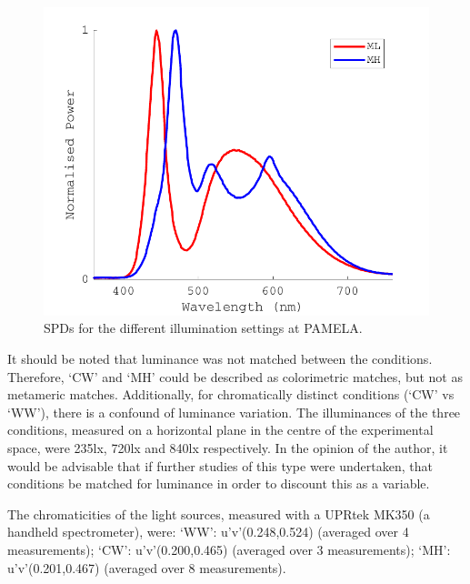 \begin{figure}[hbtp] %
\includegraphics[max width=\textwidth]{figs/tablet/PAMELA_SPD2.pdf}
\caption{\gls{SPD}s for the different illumination settings at \gls{PAMELA}.}
\label{fig:PAMELAlights5}
\end{figure}

It should be noted that luminance was not matched between the conditions. Therefore, `CW' and `MH' could be described as colorimetric matches, but not as metameric matches. Additionally, for chromatically distinct conditions (`CW' vs `WW'), there is a confound of luminance variation. The illuminances of the three conditions, measured on a horizontal plane in the centre of the experimental space, were 235lx, 720lx and 840lx respectively. In the opinion of the author, it would be advisable that if further studies of this type were undertaken, that conditions be matched for luminance in order to discount this as a variable. 

The chromaticities of the light sources, measured with a UPRtek MK350 (a handheld spectrometer), were:
`WW': 	u'v'(0.248,0.524) (averaged over 4 measurements);
`CW': 	u'v'(0.200,0.465) (averaged over 3 measurements);
`MH': 	u'v'(0.201,0.467) (averaged over 8 measurements).

